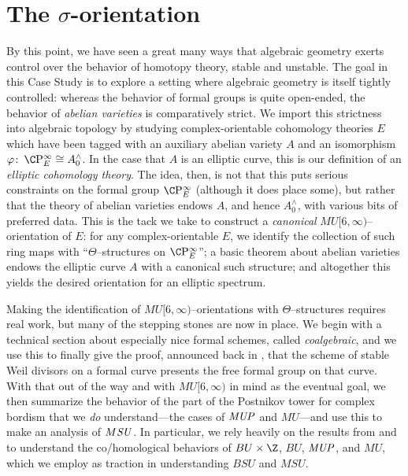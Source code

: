 
\chapter{The \texorpdfstring{\(\sigma\)}{sigma}-orientation}\label{ChapterSigmaOrientation}

By this point, we have seen a great many ways that algebraic geometry exerts control over the behavior of homotopy theory, stable and unstable.  The goal in this Case Study is to explore a setting where algebraic geometry is itself tightly controlled: whereas the behavior of formal groups is quite open-ended, the behavior of \emph{abelian varieties} is comparatively strict.  We import this strictness into algebraic topology by studying complex-orientable cohomology theories \(E\) which have been tagged with an auxiliary abelian variety \(A\) and an isomorphism \(\phi\co \CP^\infty_E \cong A^\wedge_0\).  In the case that \(A\) is an elliptic curve, this is our definition of an \textit{elliptic cohomology theory}.  The idea, then, is not that this puts serious constraints on the formal group \(\CP^\infty_E\) (although it does place some), but rather that the theory of abelian varieties endows \(A\), and hence \(A^\wedge_0\), with various bits of preferred data.  This is the tack we take to construct a \emph{canonical} \(MU[6, \infty)\)--orientation of \(E\): for any complex-orientable \(E\), we identify the collection of such ring maps with ``\(\Theta\)--structures on \(\CP^\infty_E\)''; a basic theorem about abelian varieties endows the elliptic curve \(A\) with a canonical such structure; and altogether this yields the desired orientation for an elliptic spectrum.

Making the identification of \(MU[6, \infty)\)--orientations with \(\Theta\)--structures requires real work, but many of the stepping stones are now in place.  We begin with a technical section about especially nice formal schemes, called \textit{coalgebraic}, and we use this to finally give the proof, announced back in , that the scheme of stable Weil divisors on a formal curve presents the free formal group on that curve.  With that out of the way and with \(MU[6, \infty)\) in mind as the eventual goal, we then summarize the behavior of the part of the Postnikov tower for complex bordism that we \emph{do} understand---the cases of \(\mathit{MUP}\) and \(MU\)---and use this to make an analysis of \(M\mathit{SU}\).  In particular, we rely heavily on the results from  and  to understand the co/homological behaviors of \(BU \times \Z\), \(BU\), \(\mathit{MUP}\), and \(MU\), which we employ as traction in understanding \(BSU\) and \(MSU\).

